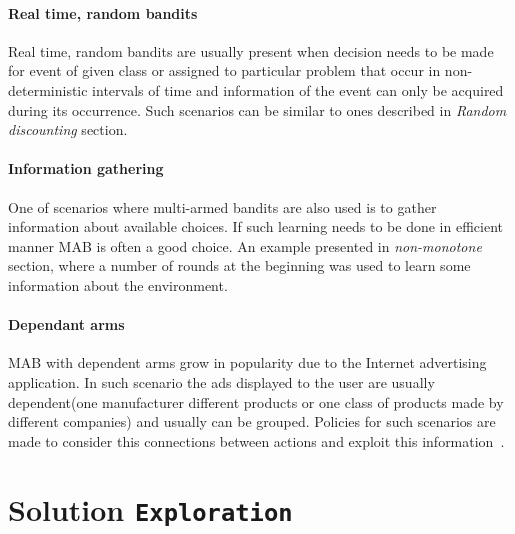 \documentclass[12pt, a4paper, pdflatex, leqno]{report}
\begin{document}
\subsubsection{Real time, random bandits}
Real time, random bandits are usually present when decision needs to be made for event of given class or assigned to particular problem that occur in non-deterministic intervals of time and information of the event can only be acquired during its occurrence. Such scenarios can be similar to ones described in \emph{Random discounting} section.\\
\subsubsection{Information gathering}
One of scenarios where multi-armed bandits are also used is to gather information about available choices. If such learning needs to be done in efficient manner MAB is often a good choice. An example presented in \emph{non-monotone} section, where a number of rounds at the beginning was used to learn some information about the environment.\\
\subsubsection{Dependant arms}
MAB with dependent arms grow in popularity due to the Internet advertising application. In such scenario the ads displayed to the user are usually dependent(one manufacturer different products or one class of products made by different companies) and usually can be grouped. Policies for such scenarios are made to consider this connections between actions and exploit this information~\citep{Pandey:2007:MBP:1273496.1273587}.\\


\chapter{Solution \texttt{\textbf{Exploration}}}
\end{document}
